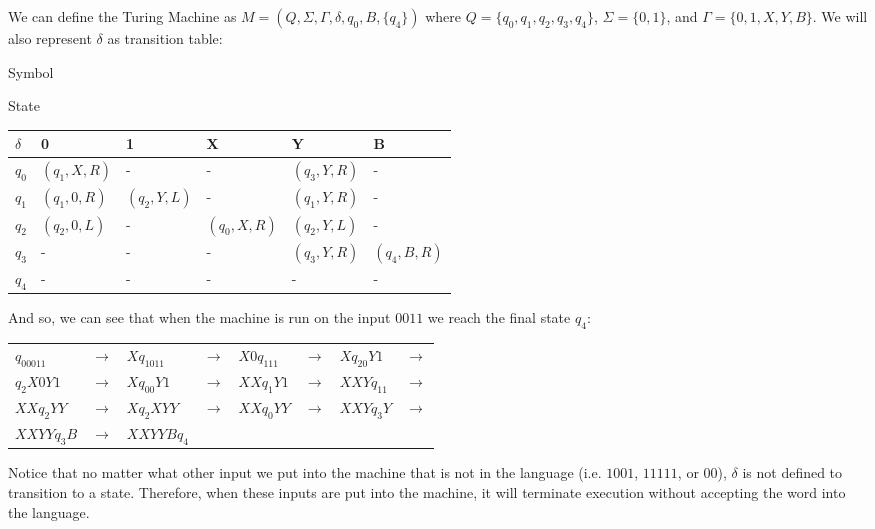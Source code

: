 \documentclass[12pt]{article}
\begin{document}
We can define the Turing Machine as $M=(Q,\Sigma, \Gamma, \delta, q_0, B, \{q_4\})$ where $Q = \{q_0, q_1, q_2, q_3, q_4 \}$, $\Sigma = \{0,1\}$, and $\Gamma = \{0,1,X,Y,B\}$. We will also represent $\delta$ as transition table:

\begin{center}
Symbol

State
\begin{tabular}{ l | l   l   l   l   l }

$\delta$	& 0				& 1				& X				& Y				& B			\\ \hline
$q_0$ 	& $(q_1,X,R)$		& -				& -				& $(q_3,Y,R)$		& -			\\ 
$q_1$	& $(q_1,0,R)$		& $(q_2,Y,L)$		& -				& $(q_1,Y,R)$		& -			\\
$q_2$	& $(q_2,0,L)$		& -				&$ (q_0,X,R) $		& $(q_2,Y,L)$		& -			\\
$q_3$	& -				& -				& -				& $(q_3,Y,R)$		& $(q_4,B,R) $	\\
$q_4$	& -				& -				& -				& -				& -			\\ 
    
\end{tabular}
\end{center}

And so, we can see that when the machine is run on the input $0011$ we reach the final state $q_4$:

\begin{center}
\begin{tabular}{l l l l l l l l}

$q_00011$	& $\to$	& $Xq_1011$		&$\to$	& $X0q_111$		& $\to$	& $Xq_20Y1$		&$\to$	\\
$q_2X0Y1$	& $\to$	& $Xq_00Y1$		&$\to$	& $XXq_1Y1$		& $\to$	& $ XXYq_11$		&$\to$	\\
$XXq_2YY$	& $\to$	& $Xq_2XYY$		&$\to$	& $XXq_0YY$		& $\to$	& $ XXYq_3Y$		&$\to$	\\
$XXYYq_3B$	& $\to$	& $XXYYBq_4$	&		&				&		&				&		\\

    
\end{tabular}
\end{center}

\noindent Notice that no matter what other input we put into the machine that is not in the language (i.e. $1001$, $11111$, or $00$), $\delta$ is not defined to transition to a state. Therefore, when these inputs are put into the machine, it will terminate execution without accepting the word into the language.
\end{document}
